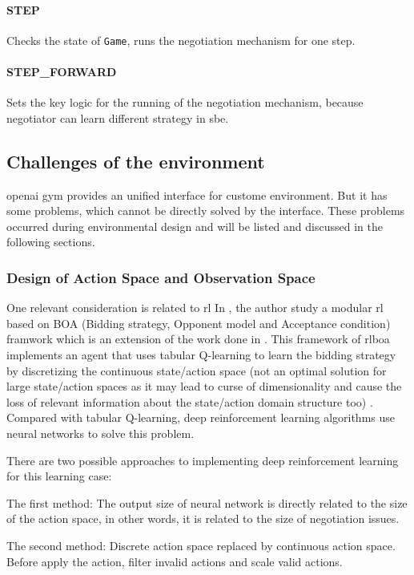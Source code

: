 \paragraph{STEP} Checks the state of \texttt{Game}, runs the negotiation mechanism for one step.
\paragraph{STEP\_FORWARD} Sets the key logic for the running of the negotiation mechanism, because negotiator can learn different strategy in \gls{sbe}. 

\subsection{Challenges of the environment}
\gls{openai gym} provides an unified interface for custome environment. But it has some problems, which cannot be directly solved by the interface. These problems occurred during environmental design and will be listed and discussed in the following sections. 

\subsubsection{Design of Action Space and Observation Space}
One relevant consideration is related to \gls{rl} In \parencite{Bakker2019RLBOAAM}, the author study a modular \gls{rl} based on BOA (Bidding strategy, Opponent model and Acceptance condition) framwork which is an extension of the work done in \parencite{Bakker2019RLBOAAM}. This framework of \gls{rlboa} implements an agent that uses tabular Q-learning to learn the bidding strategy by discretizing the continuous state/action space (not an optimal solution for large state/action spaces as it may lead to curse of dimensionality and cause the loss of relevant information about the state/action domain structure too) \parencite{bagga2020deep}. 
Compared with tabular Q-learning, deep reinforcement learning algorithms use neural networks to solve this problem.
 
There are two possible approaches to implementing deep reinforcement learning for this learning case:

The first method: The output size of neural network is directly related to the size of the action space, in other words, it is related to the size of negotiation issues. 

The second method: Discrete action space replaced by continuous action space. Before apply the action, filter invalid actions and scale valid actions.

